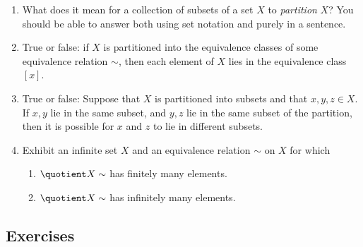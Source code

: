 \begin{enumerate}
  \item What does it mean for a collection of subsets of a set $X$ to \emph{partition} $X$? You should be able to answer both using set notation and purely in a sentence.
  \item True or false: if $X$ is partitioned into the equivalence classes of some equivalence relation $\sim$, then each element of $X$ lies in the equivalence class $[x]$.
  \item True or false: Suppose that $X$ is partitioned into subsets and that $x,y,z\in X$. If $x,y$ lie in the same subset, and $y,z$ lie in the same subset of the partition, then it is possible for $x$ and $z$ to lie in different subsets.
  \item Exhibit an infinite set $X$ and an equivalence relation $\sim$ on $X$ for which
  \begin{enumerate}
    \item $\quotient X\sim$ has finitely many elements.
    \item $\quotient X\sim$ has infinitely many elements.
	\end{enumerate}
\end{enumerate}


\subsection*{Exercises}

